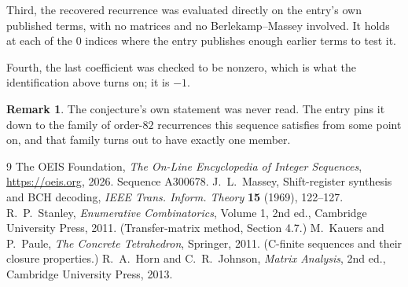 \documentclass[11pt,a4paper]{article}
\theoremstyle{plain}
\theoremstyle{definition}
\newtheorem{remark}[theorem]{Remark}
\begin{document}
Third, the recovered recurrence was evaluated directly on the entry's own published terms, with
no matrices and no Berlekamp--Massey involved. It holds at each of the $0$ indices where
the entry publishes enough earlier terms to test it.

Fourth, the last coefficient was checked to be nonzero, which is what the identification above
turns on; it is $-1$.

\begin{remark}
The conjecture's own statement was never read. The entry pins it down to the family of
order-$82$ recurrences this sequence satisfies from some point on, and that family turns
out to have exactly one member.
\end{remark}

\begin{thebibliography}{9}
 The OEIS Foundation, \emph{The On-Line Encyclopedia of Integer
Sequences}, \url{https://oeis.org}, 2026. Sequence A300678.
 J.~L.~Massey, Shift-register synthesis and BCH decoding, \emph{IEEE
Trans. Inform. Theory} \textbf{15} (1969), 122--127.
 R.~P.~Stanley, \emph{Enumerative Combinatorics}, Volume 1, 2nd ed.,
Cambridge University Press, 2011. (Transfer-matrix method, Section 4.7.)
 M.~Kauers and P.~Paule, \emph{The Concrete Tetrahedron}, Springer, 2011.
(C-finite sequences and their closure properties.)
 R.~A.~Horn and C.~R.~Johnson, \emph{Matrix Analysis}, 2nd ed., Cambridge
University Press, 2013.
\end{thebibliography}
\end{document}
